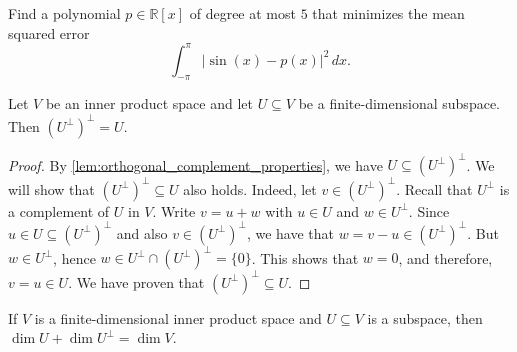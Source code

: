 \begin{exercise}
  \label{exc:least_squares_polynomial_sine}
  Find a polynomial $p \in \mathbb{R}[x]$ of degree at most $5$ that minimizes the mean squared error
  \[
  \int_{-\pi}^\pi |\sin(x) - p(x)|^2 \, dx.
  \]
\end{exercise}

\begin{corollary}
\label{cor:bidual_orthogonal_complement}
Let $V$ be an inner product space and let $U \subseteq V$ be a finite-di\-men\-sional subspace. Then $(U^\perp)^\perp = U$.
\end{corollary}

\begin{proof}
By \cref{lem:orthogonal_complement_properties}, we have $U \subseteq (U^\perp)^\perp$. We will show that $(U^\perp)^\perp \subseteq U$ also holds. Indeed, let $v \in (U^\perp)^\perp$.
Recall that $U^\perp$ is a complement of $U$ in $V$.
Write $v = u + w$ with $u \in U$ and $w \in U^\perp$.
Since $u \in U \subseteq (U^\perp)^\perp$ and also $v \in (U^\perp)^\perp$, we have that $w = v - u \in (U^\perp)^\perp$. But $w \in U^\perp$, hence $w \in U^\perp \cap (U^\perp)^\perp = \{0\}$.
This shows that $w = 0$, and therefore, $v = u \in U$. We have proven that $(U^\perp)^\perp \subseteq U$.
\end{proof}

\begin{corollary}
\label{cor:dim_orthogonal_complement}
If $V$ is a finite-di\-men\-sional inner product space and $U \subseteq V$ is a subspace, then $\dim U + \dim U^\perp = \dim V$.
\end{corollary}

